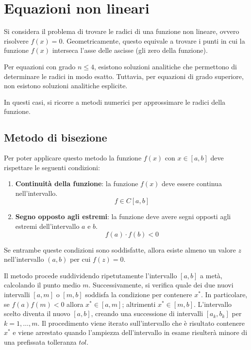 \documentclass{article}
\begin{document}
\section{Equazioni non lineari}
Si considera  il problema di trovare le radici di una funzione non
lineare, ovvero risolvere $f(x)=0$. 
Geometricamente, questo equivale a trovare i punti in cui la funzione $f(x)$
interseca l'asse delle ascisse (gli zero della funzione). 

\begin{center}
\end{center}

Per equazioni con grado $n\leq 4$, esistono soluzioni analitiche che
permettono di determinare le radici in modo esatto. Tuttavia, per equazioni di
grado superiore, non esistono soluzioni analitiche esplicite.

In questi casi, si ricorre a metodi numerici per approssimare le radici della
funzione.
\subsection{Metodo di bisezione}
Per poter applicare questo metodo la funzione $f(x)$ con $x\in[a,b]$ deve
rispettare le seguenti condizioni:
\begin{enumerate}
    \item \textbf{Continuità della funzione}: la funzione $f(x)$ deve essere
        continua nell'intervallo.
        $$f\in C[a,b]$$
    \item \textbf{Segno opposto agli estremi}: la funzione deve avere segni
        opposti agli estremi dell'intervallo $a$ e $b$.
        $$f(a)\cdot f(b)<0$$
\end{enumerate}
Se entrambe queste condizioni sono soddisfatte, allora esiste almeno un valore
$z$ nell'intervallo $(a,b)$ per cui $f(z)=0$.

Il metodo procede suddividendo ripetutamente l'intervallo $[a,b]$ a metà,
calcolando il punto medio $m$. Successivamente, si verifica quale dei due
nuovi intervalli $[a,m]$ o $[m,b]$ soddisfa la condizione per contenere $x^*$.
In particolare, se $f(a)f(m)<0$ allora $x^*\in[a,m]$; altrimenti
$x^*\in[m,b]$. L'intervallo scelto diventa il nuovo $[a,b]$, creando una
successione di intervalli $[a_k, b_k]$ per $k=1,\ldots,m$. Il procedimento
viene iterato sull'intervallo che è risultato contenere $x^*$ e viene
arrestato quando l'ampiezza dell'intervallo in esame risulterà minore di una
prefissata tolleranza $tol$.
\end{document}
